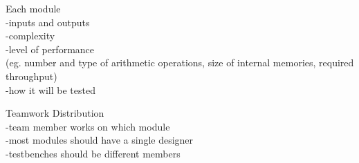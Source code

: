 \documentclass[12pt]{fpgairpods}
\begin{document}
Each module
\\-inputs and outputs
\\-complexity
\\-level of performance
\\(eg. number and type of arithmetic operations, size of internal memories, required throughput)
\\-how it will be tested

Teamwork Distribution
\\-team member works on which module 
\\-most modules should have a single designer
\\-testbenches should be different members

\printbibliography
\end{document}
